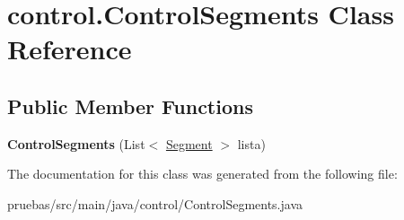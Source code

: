 \hypertarget{classcontrol_1_1_control_segments}{}\section{control.\+Control\+Segments Class Reference}
\label{classcontrol_1_1_control_segments}
\subsection*{Public Member Functions}
\begin{DoxyCompactItemize}
\item 
\mbox{\label{classcontrol_1_1_control_segments_a6ff0d2b5dfb42fb1fa6d5e855b250412}} 
{\bfseries Control\+Segments} (List$<$ \mbox{\hyperlink{classclases_1_1_segment}{Segment}} $>$ lista)
\end{DoxyCompactItemize}


The documentation for this class was generated from the following file\+:\begin{DoxyCompactItemize}
\item 
pruebas/src/main/java/control/Control\+Segments.\+java\end{DoxyCompactItemize}
